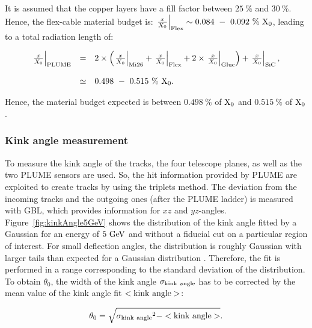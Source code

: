      It is assumed that the copper layers have a fill factor between $25~\%$ and $30~\%$.
     Hence, the flex-cable material budget is: $\left. \frac{x}{X_0} \right|_{\rm{Flex}} \sim 0.084~-~0.092~\%~\rm{X_0}$, leading to a total radiation length of:

     \begin{equation}
       \begin{array}{lcl}
         \left. \frac{x}{X_0} \right|_{\rm{PLUME}} & = & 2 \times \left( \left. \frac{x}{X_0} \right|_{\rm{Mi26}} + \left. \frac{x}{X_0} \right|_{\rm{Flex}} + 2 \times \left. \frac{x}{X_0} \right|_{\rm{Glue}}\right) + \left. \frac{x}{X_0} \right|_{\rm{SiC}}, \\
         \\
         & \simeq & 0.498~-~0.515~\%~\rm{X_0}.
       \end{array}
       \label{eq:X0_theory}
     \end{equation}

     Hence, the material budget expected is between $0.498~\%$ of $\rm{X_0}$ and $0.515~\%$ of $\rm{X_0}$.

     \subsubsection{Kink angle measurement}

   To measure the kink angle of the tracks, the four telescope planes, as well as the two \gls{PLUME} sensors are used.
   So, the hit information provided by \gls{PLUME} are exploited to create tracks by using the triplets method.
   The deviation from the incoming tracks and the outgoing ones (after the \gls{PLUME} ladder) is measured with \gls{GBL}, which provides information for $xz$ and $yz$-angles.
   Figure~\ref{fig:kinkAngle5GeV} shows the distribution of the kink angle fitted by a Gaussian for an energy of $5~\rm{GeV}$ and without a fiducial cut on a particular region of interest.
   For small deflection angles, the distribution is roughly Gaussian with larger tails than expected for a Gaussian distribution \cite{Agashe:2014kda}.
   Therefore, the fit is performed in a range corresponding to the standard deviation of the distribution.
   To obtain $\theta_0$, the width of the kink angle $\rm{\sigma_{kink~angle}}$ has to be corrected by the mean value of the kink angle fit $<\rm{kink~angle}>$:
   
   \begin{equation}
     \theta_0 = \sqrt{\rm{\sigma_{kink~angle}}^2 - <\rm{kink~angle}>}.
     \label{eq:kink}
   \end{equation}
   
